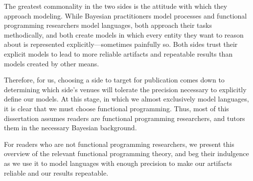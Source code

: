 \begin{comment}
Bridging the two sides is complicated by these two facts:
\begin{enumerate}
	\item Bayesian notation often denotes uncountable things, so we must interpret it using a more expressive theory of computation than functional programming researchers are accustomed to.
\label{complication:uncountable}
	\item Programs in nontrivial languages with probabilistic choice can denote distributions that do not have densities, so we must use a more expressive theory of probability than Baysian practitioners are accustomed to.
\label{complication:probability}
\end{enumerate}
To address complication~\ref{complication:uncountable}, we design \lzfclang, a supercomputational but intuitive $\lambda$-calculus, as a target language for interpretation (Chapter~\ref{ch:lambda-zfc}).
To address complication~\ref{complication:probability}, we first present a simplified version of the more expressive theory (Chapter~\ref{ch:countable-models}), then avoid most of measure theory by concentrating on its one aspect we have found that leads to direct implementation: preimages (Chapter~\ref{ch:preimage1}).
\end{comment}

The greatest commonality in the two sides is the attitude with which they approach modeling.
While Bayesian practitioners model processes and functional programming researchers model languages, both approach their tasks methodically, and both create models in which every entity they want to reason about is represented explicitly---sometimes painfully so.
Both sides trust their explicit models to lead to more reliable artifacts and repeatable results than models created by other means.

Therefore, for us, choosing a side to target for publication comes down to determining which side's venues will tolerate the precision necessary to explicitly define our models.
At this stage, in which we almost exclusively model languages, it is clear that we must choose functional programming.
Thus, most of this dissertation assumes readers are functional programming researchers, and tutors them in the necessary Bayesian background.

For readers who are not functional programming researchers, we present this overview of the relevant functional programming theory, and beg their indulgence as we use it to model languages with enough precision to make our artifacts reliable and our results repeatable.

